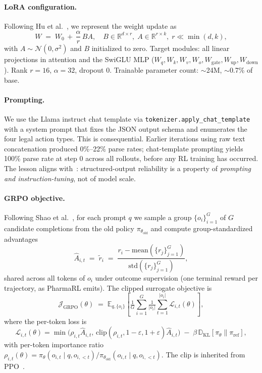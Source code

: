 \documentclass[11pt,a4paper]{article}
\newcommand{\loraRank}{16}                   %
\newcommand{\loraAlpha}{32}                  %
\begin{document}
\paragraph{LoRA configuration.} Following Hu et al.~\cite{hu2022lora}, we represent the weight update as
\begin{equation}
W \;=\; W_0 \,+\, \frac{\alpha}{r}\,B A,\quad B \in \mathbb{R}^{d\times r},\; A \in \mathbb{R}^{r\times k},\; r \ll \min(d,k),
\end{equation}
with $A \sim \mathcal{N}(0, \sigma^2)$ and $B$ initialized to zero. Target modules: all linear projections in attention and the SwiGLU MLP ($W_q, W_k, W_v, W_o, W_{\text{gate}}, W_{\text{up}}, W_{\text{down}}$). Rank $r=\loraRank$, $\alpha=\loraAlpha$, dropout $0$. Trainable parameter count: $\sim$24M, $\sim$0.7\% of base.

\paragraph{Prompting.} We use the Llama instruct chat template via \texttt{tokenizer.apply\_chat\_template} with a system prompt that fixes the JSON output schema and enumerates the four legal action types. This is consequential. Earlier iterations using raw text concatenation produced 0\%--22\% parse rates; chat-template prompting yields 100\% parse rate at step 0 across all rollouts, before any RL training has occurred. The lesson aligns with~\cite{guo2023chemllmbench}: structured-output reliability is a property of \emph{prompting and instruction-tuning}, not of model scale.

\paragraph{GRPO objective.} Following Shao et al.~\cite{shao2024deepseekmath}, for each prompt $q$ we sample a group $\{o_i\}_{i=1}^{G}$ of $G$ candidate completions from the old policy $\pi_{\theta_{\text{old}}}$ and compute group-standardized advantages
\begin{equation}
\hat A_{i,t} \;=\; \tilde r_i \;=\; \frac{r_i - \mathrm{mean}(\{r_j\}_{j=1}^G)}{\mathrm{std}(\{r_j\}_{j=1}^G)},
\end{equation}
shared across all tokens of $o_i$ under outcome supervision (one terminal reward per trajectory, as PharmaRL emits). The clipped surrogate objective is
\begin{equation}
\mathcal{J}_{\text{GRPO}}(\theta) \;=\; \mathbb{E}_{q,\{o_i\}}\!\left[ \tfrac{1}{G}\sum_{i=1}^{G} \tfrac{1}{|o_i|} \sum_{t=1}^{|o_i|} \mathcal{L}_{i,t}(\theta) \right],
\end{equation}
where the per-token loss is
\begin{equation}
\mathcal{L}_{i,t}(\theta) = \min\!\big(\rho_{i,t}\hat A_{i,t},\, \mathrm{clip}(\rho_{i,t},1-\varepsilon,1+\varepsilon)\hat A_{i,t}\big) \;-\; \beta\, \mathbb{D}_{\text{KL}}\!\left[\pi_\theta \| \pi_{\text{ref}}\right],
\end{equation}
with per-token importance ratio $\rho_{i,t}(\theta) = \pi_\theta(o_{i,t}\!\mid\! q,o_{i,<t})/\pi_{\theta_{\text{old}}}(o_{i,t}\!\mid\! q,o_{i,<t})$. The clip is inherited from PPO~\cite{schulman2017ppo}.
\end{document}
